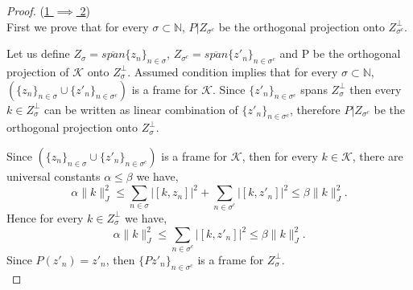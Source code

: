 \documentclass[10pt,a4paper]{amsart}
\begin{document}
\begin{proof}
	
 \noindent  (\underline{1 $\implies$ 2})\\
 First we prove that for every $\sigma \subset \mathbb N$, $P|Z_{\sigma^c}$ be the orthogonal projection  onto $Z^\perp_{\sigma^c}$.
 
	Let us define $ Z_{\sigma} = \overline{span} \{z_n\}_{n \in \sigma}$, 
	$ Z_{\sigma^c} = \overline{span} \{z'_n\}_{n \in \sigma^c}$ and P be the orthogonal projection of $\mathcal{K}$ onto $Z_{\sigma}^\perp$.
	Assumed condition implies that for every $\sigma \subset \mathbb N$, $(\{z_n\}_{n \in \sigma} \cup \{z'_n\}_{n \in \sigma^c})$ is a  frame for $\mathcal{K}$.
	Since $\{z'_n\}_{n \in \sigma^c}$ spans $Z_{\sigma}^\perp$ then every $k \in Z_{\sigma}^\perp$ can be written as linear combination of $\{z'_n\}_{n \in \sigma^c}$, therefore  $P|Z_{\sigma^c}$ be the orthogonal projection  onto $Z^\perp_{\sigma}$.
	

	Since $(\{z_n\}_{n \in \sigma} \cup \{z'_n\}_{n \in \sigma^c})$ is a  frame for $\mathcal{K}$, then for every  $k \in \mathcal{K}$, there are universal constants $\alpha \leq \beta$ we have,
	$$\alpha \|k\|_{J}^2 \leq \sum\limits_{n \in \sigma} |[k, z_n]|^2 + \sum\limits_{n \in \sigma^c} |[k, z'_n]|^2 \leq \beta \|k\|_{J}^2.$$
Hence	for every $k \in Z_{\sigma}^\perp$ we have,
	$$\alpha \|k\|_{J}^2 \leq  \sum\limits_{n \in \sigma^c} |[k, z'_n]|^2 \leq \beta \|k\|_{J}^2.$$
	Since $P(z'_n) = z'_n$, then $\{Pz'_n\}_{n \in \sigma^c}$ is a frame for $Z_{\sigma}^\perp.$\\
	

\end{proof}
\end{document}
